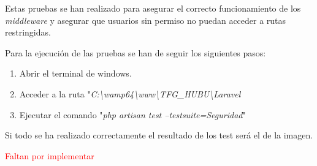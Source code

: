 Estas pruebas se han realizado para asegurar el correcto funcionamiento de los \textit{middleware} y asegurar que usuarios sin permiso no puedan acceder a rutas restringidas.

Para la ejecución de las pruebas se han de seguir los siguientes pasos:

\begin{enumerate}
    \item Abrir el terminal de windows.
    \item Acceder a la ruta "\textit{C:\textbackslash{}wamp64\textbackslash{}www\textbackslash{}TFG\_HUBU\textbackslash{}Laravel}
    \item Ejecutar el comando "\textit{php artisan test --testsuite=Seguridad}"
\end{enumerate}

Si todo se ha realizado correctamente el resultado de los test será el de la imagen.

\textcolor{red}{Faltan por implementar}